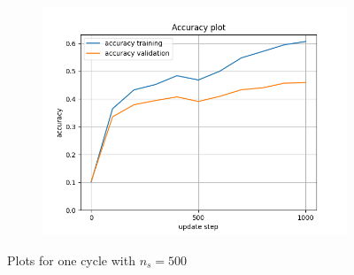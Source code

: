 \documentclass[12pt, a4paper]{article}
\begin{document}
\begin{figure}[H]
\begin{subfigure}{0.45\textwidth}
        \includegraphics[width=\textwidth]{results/1-500accuracy.png}
    \end{subfigure}
    \caption{Plots for one cycle with $n_s=500$}
    \label{fig:one cycle}
\end{figure}
\end{document}
